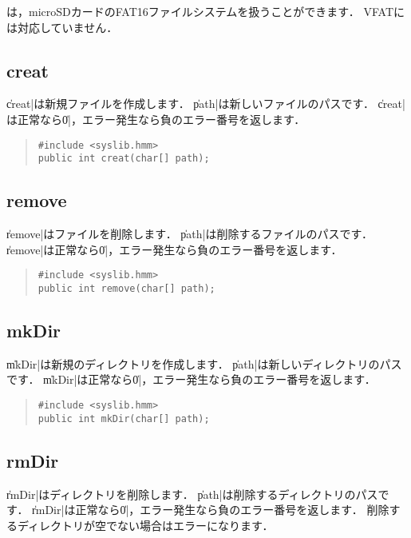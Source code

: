 \tacos は，microSDカードのFAT16ファイルシステムを扱うことができます．
VFATには対応していません．

\subsection{creat}

\|creat|は新規ファイルを作成します．
\|path|は新しいファイルのパスです．
\|creat|は正常なら\|0|，エラー発生なら負のエラー番号を返します．

\begin{quote}
\begin{verbatim}
#include <syslib.hmm>
public int creat(char[] path);
\end{verbatim}
\end{quote}

\subsection{remove}

\|remove|はファイルを削除します．
\|path|は削除するファイルのパスです．
\|remove|は正常なら\|0|，エラー発生なら負のエラー番号を返します．

\begin{quote}
\begin{verbatim}
#include <syslib.hmm>
public int remove(char[] path);
\end{verbatim}
\end{quote}

\subsection{mkDir}

\|mkDir|は新規のディレクトリを作成します．
\|path|は新しいディレクトリのパスです．
\|mkDir|は正常なら\|0|，エラー発生なら負のエラー番号を返します．

\begin{quote}
\begin{verbatim}
#include <syslib.hmm>
public int mkDir(char[] path);
\end{verbatim}
\end{quote}

\subsection{rmDir}

\|rmDir|はディレクトリを削除します．
\|path|は削除するディレクトリのパスです．
\|rmDir|は正常なら\|0|，エラー発生なら負のエラー番号を返します．
削除するディレクトリが空でない場合はエラーになります．

